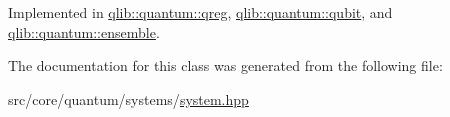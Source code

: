 Implemented in \hyperlink{classqlib_1_1quantum_1_1qreg_a51eb9abfde64d764ca2afa27666df0e1}{qlib\+::quantum\+::qreg}, \hyperlink{classqlib_1_1quantum_1_1qubit_aa16b11ad849b672489c625196c800dd3}{qlib\+::quantum\+::qubit}, and \hyperlink{classqlib_1_1quantum_1_1ensemble_ac170f82a86704e08e8f2bebc721cf03b}{qlib\+::quantum\+::ensemble}.



The documentation for this class was generated from the following file\+:\begin{DoxyCompactItemize}
\item 
src/core/quantum/systems/\hyperlink{system_8hpp}{system.\+hpp}\end{DoxyCompactItemize}
